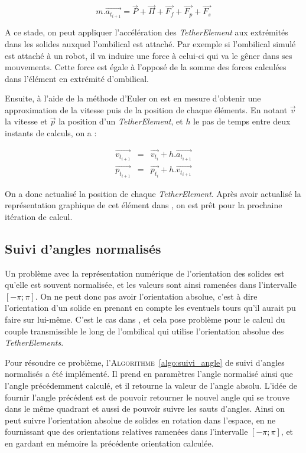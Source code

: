 				\begin{equation}
					m.\overrightarrow{a_{t_{i+1}}} = \overrightarrow{P} + \overrightarrow{\Pi} + \overrightarrow{F_f} + \overrightarrow{F_p} + \overrightarrow{F_s}
					\label{eq:newton}
				\end{equation}

				A ce stade, on peut appliquer l'accélération des \textit{TetherElement} aux extrémités dans les solides auxquel l'ombilical est attaché. Par exemple si l'ombilical simulé est attaché à un robot, il va induire une force à celui-ci qui va le gêner dans ses mouvements. Cette force est égale à l'opposé de la somme des forces calculées dans l'élément en extrémité d'ombilical.
				
				Ensuite, à l'aide de la méthode d'Euler on est en mesure d'obtenir une approximation de la vitesse puis de la position de chaque éléments. En notant $\overrightarrow{v}$ la vitesse et $\overrightarrow{p}$ la position d'un \textit{TetherElement}, et $h$ le pas de temps entre deux instants de calculs, on a :

				\begin{eqnarray}
					\overrightarrow{v_{t_{i+1}}} & = & \overrightarrow{v_{t_i}} + h.\overrightarrow{a_{t_{i+1}}} \\
					\overrightarrow{p_{t_{i+1}}} & = & \overrightarrow{p_{t_i}} + h.\overrightarrow{v_{t_{i+1}}}
					\label{eq:euler}
				\end{eqnarray}

				On a donc actualisé la position de chaque \textit{TetherElement}. Après avoir actualisé la représentation graphique de cet élément dans \gazebo{}, on est prêt pour la prochaine itération de calcul.
			
			\subsection{Suivi d'angles normalisés}
				Un problème avec la représentation numérique de l'orientation des solides est qu'elle est souvent normalisée, et les valeurs sont ainsi ramenées dans l'intervalle $[-\pi; \pi]$. On ne peut donc pas avoir l'orientation absolue, c'est à dire l'orientation d'un solide en prenant en compte les eventuels tours qu'il aurait pu faire sur lui-même. C'est le cas dans \gazebo{}, et cela pose problème pour le calcul du couple transmissible le long de l'ombilical qui utilise l'orientation absolue des \textit{TetherElements}.
			
				Pour résoudre ce problème, l'\textsc{Algorithme}~\ref{algo:suivi_angle} de suivi d'angles normalisés a été implémenté. Il prend en paramètres l'angle normalisé ainsi que l'angle précédemment calculé, et il retourne la valeur de l'angle absolu. L'idée de fournir l'angle précédent est de pouvoir retourner le nouvel angle qui se trouve dans le même quadrant et aussi de pouvoir suivre les sauts d'angles. Ainsi on peut suivre l'orientation absolue de solides en rotation dans l'espace, en ne fournissant que des orientations relatives ramenées dans l'intervalle $[-\pi; \pi]$, et en gardant en mémoire la précédente orientation calculée.
				
